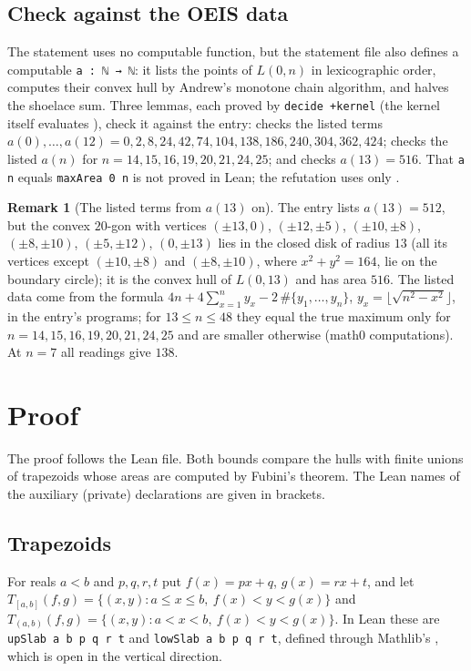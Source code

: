 \documentclass[11pt]{amsart}
\theoremstyle{plain}
\theoremstyle{definition}
\newtheorem{remark}[theorem]{Remark}
\begin{document}
\subsection*{Check against the OEIS data}
The statement uses no computable function, but the statement file also defines a computable \texttt{a~:~ℕ~→~ℕ}: it lists the points of $L(0,n)$ in lexicographic order, computes their convex hull by Andrew's monotone chain algorithm, and halves the shoelace sum. Three lemmas, each proved by \texttt{decide +kernel} (the kernel itself evaluates ), check it against the entry:  checks the listed terms $a(0),\dots,a(12)=0,2,8,24,42,74,104,138,186,240,304,362,424$;  checks the listed $a(n)$ for $n=14,15,16,19,20,21,24,25$; and  checks $a(13)=516$. That \texttt{a n} equals \texttt{maxArea 0 n} is not proved in Lean; the refutation uses only .

\begin{remark}[The listed terms from $a(13)$ on]\label{rem:data}
The entry lists $a(13)=512$, but the convex $20$-gon with vertices $(\pm13,0)$, $(\pm12,\pm5)$, $(\pm10,\pm8)$, $(\pm8,\pm10)$, $(\pm5,\pm12)$, $(0,\pm13)$ lies in the closed disk of radius $13$ (all its vertices except $(\pm10,\pm8)$ and $(\pm8,\pm10)$, where $x^2+y^2=164$, lie on the boundary circle); it is the convex hull of $L(0,13)$ and has area $516$. The listed data come from the formula $4n+4\sum_{x=1}^n y_x-2\,\#\{y_1,\dots,y_n\}$, $y_x=\lfloor\sqrt{n^2-x^2}\rfloor$, in the entry's programs; for $13\le n\le48$ they equal the true maximum only for $n=14,15,16,19,20,21,24,25$ and are smaller otherwise (math0 computations). At $n=7$ all readings give $138$.
\end{remark}

\section{Proof}\label{sec:proof}

The proof follows the Lean file. Both bounds compare the hulls with finite unions of trapezoids whose areas are computed by Fubini's theorem. The Lean names of the auxiliary (private) declarations are given in brackets.

\subsection{Trapezoids}
For reals $a<b$ and $p,q,r,t$ put $f(x)=px+q$, $g(x)=rx+t$, and let
$T_{[a,b]}(f,g)=\{(x,y):a\le x\le b,\ f(x)<y<g(x)\}$ and $T_{(a,b)}(f,g)=\{(x,y):a<x<b,\ f(x)<y<g(x)\}$.
In Lean these are \texttt{upSlab a b p q r t} and \texttt{lowSlab a b p q r t}, defined through Mathlib's , which is open in the vertical direction.
\end{document}
